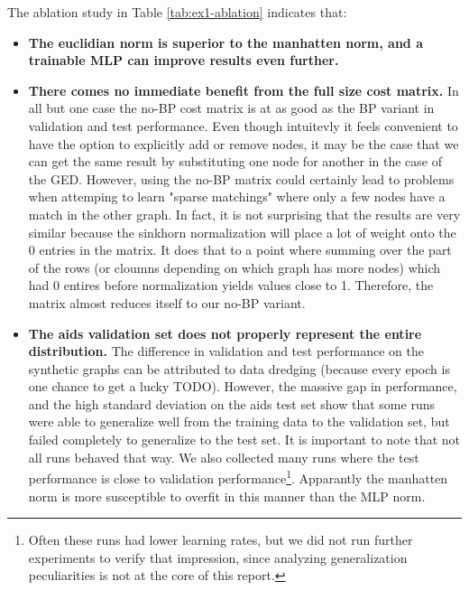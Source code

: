 The ablation study in Table \ref{tab:ex1-ablation} indicates that:
\begin{itemize}
    \itemsep0em
    \item \textbf{The euclidian norm is superior to the manhatten norm, and a trainable MLP can improve results even further.}
    \item \textbf{There comes no immediate benefit from the full size cost matrix.} In all but one case the no-BP cost matrix is at as good as the BP variant in validation and test performance. Even though intuitevly it feels convenient to have the option to explicitly add or remove nodes, it may be the case that we can get the same result by substituting one node for another in the case of the GED. However, using the no-BP matrix could certainly lead to problems when attemping to learn "sparse matchings" where only a few nodes have a match in the other graph. In fact, it is not surprising that the results are very similar because the sinkhorn normalization will place a lot of weight onto the 0 entries in the matrix. It does that to a point where summing over the part of the rows (or cloumns depending on which graph has more nodes) which had 0 entires before normalization yields values close to 1. Therefore, the matrix almost reduces itself to our no-BP variant.
    \item \textbf{The aids validation set does not properly represent the entire distribution.} The difference in validation and test performance on the synthetic graphs can be attributed to data dredging (because every epoch is one chance to get a lucky TODO). However, the massive gap in performance, and the high standard deviation on the aids test set show that some runs were able to generalize well from the training data to the validation set, but failed completely to generalize to the test set. It is important to note that not all runs behaved that way. We also collected many runs where the test performance is close to validation performance\footnote{Often these runs had lower learning rates, but we did not run further experiments to verify that impression, since analyzing generalization peculiarities is not at the core of this report.}. Apparantly the manhatten norm is more susceptible to overfit in this manner than the MLP norm.
\end{itemize}


